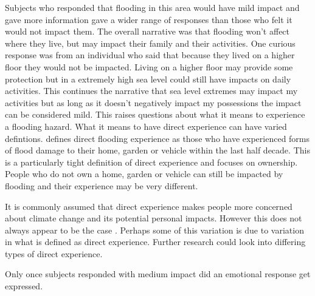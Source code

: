 Subjects who responded that flooding in this area would have mild impact and gave more information gave a wider range of responses than those who felt it would not impact them. The overall narrative was that flooding won’t affect where they live, but may impact their family and their activities. One curious response was from an individual who said that because they lived on a higher floor they would not be impacted. Living on a higher floor may provide some protection but in a extremely high sea level could still have impacts on daily activities. This continues the narrative that sea level extremes may impact my activities but as long as it doesn't negatively impact my possessions the impact can be considered mild. This raises questions about what it means to experience a flooding hazard. What it means to have direct experience can have varied defintions. 
\cite{whitmarsh_are_2008} defines direct flooding experience as those who have experienced forms of flood damage to their home, garden or vehicle within the last half decade. This is a particularly tight definition of direct experience and focuses on ownership. People who do not own a home, garden or vehicle can still be impacted by flooding and their experience may be very different.  

It is commonly assumed that direct experience makes people more concerned about climate change and its potential personal impacts\cite{lujala_role_2020}. However this does not always appear to be the case \cite{lujala_role_2020}. Perhaps some of this variation is due to variation in what is defined as direct experience. Further research could look into differing types of direct experience. 

Only once subjects responded with medium impact did an emotional response get expressed. 
